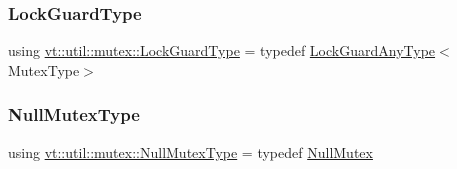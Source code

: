 \mbox{\label{namespacevt_1_1util_1_1mutex_a06a2c6944076fefe1b753e8eff4c58bd}} 
\subsubsection{\texorpdfstring{Lock\+Guard\+Type}{LockGuardType}}
{\footnotesize\ttfamily using \hyperlink{namespacevt_1_1util_1_1mutex_a06a2c6944076fefe1b753e8eff4c58bd}{vt\+::util\+::mutex\+::\+Lock\+Guard\+Type} = typedef \hyperlink{namespacevt_1_1util_1_1mutex_ae88ee37c8846b0738a5137f96f912394}{Lock\+Guard\+Any\+Type}$<$Mutex\+Type$>$}

\mbox{\label{namespacevt_1_1util_1_1mutex_a92b4648d6c680ec378e4f36ac5af414a}} 
\subsubsection{\texorpdfstring{Null\+Mutex\+Type}{NullMutexType}}
{\footnotesize\ttfamily using \hyperlink{namespacevt_1_1util_1_1mutex_a92b4648d6c680ec378e4f36ac5af414a}{vt\+::util\+::mutex\+::\+Null\+Mutex\+Type} = typedef \hyperlink{structvt_1_1util_1_1mutex_1_1_null_mutex}{Null\+Mutex}}

